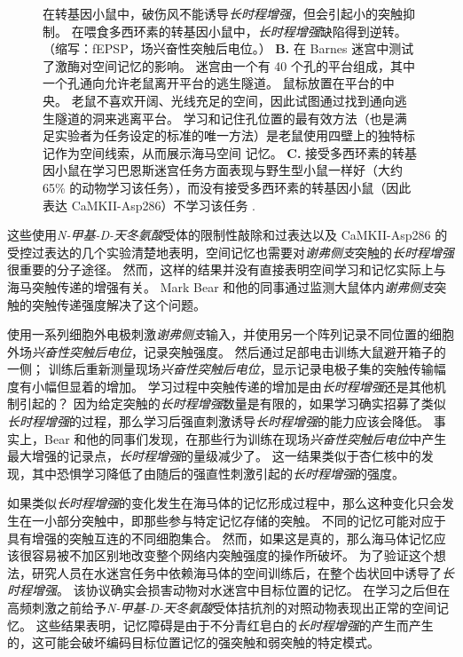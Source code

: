\begin{figure}[htbp]
{		在转基因小鼠中，破伤风不能诱导\textit{长时程增强}，但会引起小的突触抑制。 在喂食多西环素的转基因小鼠中，\textit{长时程增强}缺陷得到逆转。
		（缩写：fEPSP，场兴奋性突触后电位。）
		\textbf{B.} 在 Barnes 迷宫中测试了激酶对空间记忆的影响。
		迷宫由一个有 40 个孔的平台组成，其中一个孔通向允许老鼠离开平台的逃生隧道。
		鼠标放置在平台的中央。
		老鼠不喜欢开阔、光线充足的空间，因此试图通过找到通向逃生隧道的洞来逃离平台。
		学习和记住孔位置的最有效方法（也是满足实验者为任务设定的标准的唯一方法）是老鼠使用四壁上的独特标记作为空间线索，从而展示海马空间 记忆。
		\textbf{C.} 接受多西环素的转基因小鼠在学习巴恩斯迷宫任务方面表现与野生型小鼠一样好（大约 65\% 的动物学习该任务），而没有接受多西环素的转基因小鼠（因此表达 CaMKII-Asp286）不学习该任务 .}
	\label{fig:54_9}
\end{figure}


这些使用\textit{N-甲基-D-天冬氨酸}受体的限制性敲除和过表达以及 CaMKII-Asp286 的受控过表达的几个实验清楚地表明，空间记忆也需要对\textit{谢弗侧支}突触的\textit{长时程增强}很重要的分子途径。
然而，这样的结果并没有直接表明空间学习和记忆实际上与海马突触传递的增强有关。
Mark Bear 和他的同事通过监测大鼠体内\textit{谢弗侧支}突触的突触传递强度解决了这个问题。


使用一系列细胞外电极刺激\textit{谢弗侧支}输入，并使用另一个阵列记录不同位置的细胞外场\textit{兴奋性突触后电位}，记录突触强度。
然后通过足部电击训练大鼠避开箱子的一侧；
训练后重新测量现场\textit{兴奋性突触后电位}，显示记录电极子集的突触传输幅度有小幅但显着的增加。
学习过程中突触传递的增加是由\textit{长时程增强}还是其他机制引起的？
因为给定突触的\textit{长时程增强}数量是有限的，如果学习确实招募了类似\textit{长时程增强}的过程，那么学习后强直刺激诱导\textit{长时程增强}的能力应该会降低。
事实上，Bear 和他的同事们发现，在那些行为训练在现场\textit{兴奋性突触后电位}中产生最大增强的记录点，\textit{长时程增强}的量级减少了。
这一结果类似于杏仁核中的发现，其中恐惧学习降低了由随后的强直性刺激引起的\textit{长时程增强}的强度。


如果类似\textit{长时程增强}的变化发生在海马体的记忆形成过程中，那么这种变化只会发生在一小部分突触中，即那些参与特定记忆存储的突触。
不同的记忆可能对应于具有增强的突触互连的不同细胞集合。
然而，如果这是真的，那么海马体记忆应该很容易被不加区别地改变整个网络内突触强度的操作所破坏。
为了验证这个想法，研究人员在水迷宫任务中依赖海马体的空间训练后，在整个齿状回中诱导了\textit{长时程增强}。
该协议确实会损害动物对水迷宫中目标位置的记忆。
在学习之后但在高频刺激之前给予\textit{N-甲基-D-天冬氨酸}受体拮抗剂的对照动物表现出正常的空间记忆。
这些结果表明，记忆障碍是由于不分青红皂白的\textit{长时程增强}的产生而产生的，这可能会破坏编码目标位置记忆的强突触和弱突触的特定模式。


